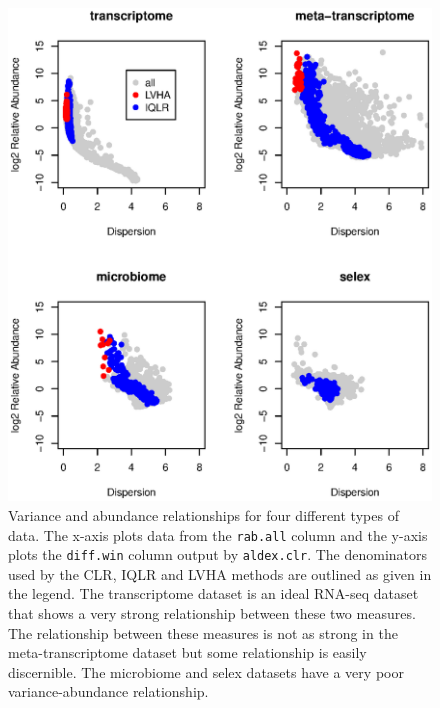 \documentclass[graybox]{svmult}
\begin{document}
%
\begin{figure}[b]
\sidecaption[t]
\includegraphics[scale=.45]{Disp-v-Abund.eps}
%
%
\caption{Variance and abundance relationships for four different types of data. The x-axis plots data from the \texttt{rab.all} column and the y-axis plots the \texttt{diff.win} column  output by \texttt{aldex.clr}. The denominators used by the CLR, IQLR and LVHA methods are outlined as given in the legend.  The transcriptome dataset is an ideal RNA-seq dataset that shows a very strong relationship between these two measures. The relationship between these measures is not as strong in the meta-transcriptome dataset but some relationship is easily discernible. The microbiome and selex datasets have a very poor variance-abundance relationship. }
\label{Fig:varabund}       %
\end{figure}
\end{document}
